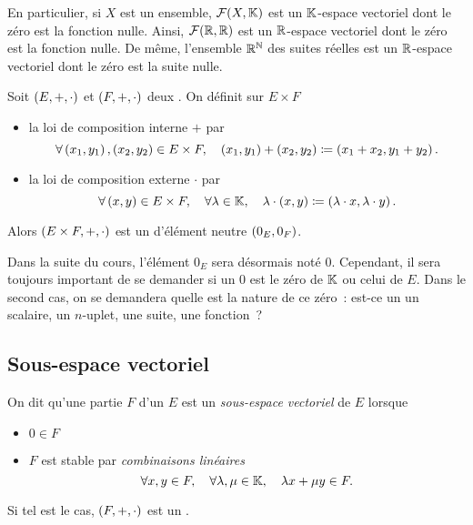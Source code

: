 \documentclass{magnolia}
\begin{document}
\begin{remarqueUnique}
\remarque En particulier, si $X$ est un ensemble, $\mathcal{F}(X,\mathbb{K})$ est un
  $\mathbb{K}$-espace vectoriel dont le \og zéro \fg est la fonction nulle. Ainsi,
  $\mathcal{F}(\mathbb{R},\mathbb{R})$ est un $\mathbb{R}$-espace vectoriel dont le \og zéro \fg est
  la fonction nulle. De même, l'ensemble $\mathbb{R}^{\mathbb{N}}$ des suites réelles est un
  $\mathbb{R}$-espace vectoriel dont le \og zéro \fg est la suite nulle.
\end{remarqueUnique}

\begin{definition}[utile=-2]
Soit $\left(E,+,\cdot\right)$ et $\left(F,+,\cdot\right)$ deux \Kevs. On définit sur $E\times F$
\begin{itemize}
\item la loi de composition interne $+$ par
  \[\forall \left(x_1,y_1\right),\left(x_2,y_2\right)\in E\times F ,\quad
    \left(x_1,y_1\right)+\left(x_2,y_2\right)\coloneqq\left(x_1+x_2,y_1+y_2\right).\]
\item la loi de composition externe $\cdot$ par
  \[\forall \left(x,y\right)\in E\times F ,\quad \forall \lambda\in\mathbb{K} ,\quad
    \lambda\cdot\left(x,y\right)\coloneqq\left(\lambda\cdot x,\lambda\cdot y\right).\]
\end{itemize}
Alors $\left(E\times F,+,\cdot\right)$ est un \Kev d'élément neutre $\left(0_E,0_F\right)$.
\end{definition}






Dans la suite du cours, l'élément $0_E$ sera désormais noté $0$. Cependant, il sera
toujours important de se demander si un $0$ est le zéro de $\mathbb{K}$ ou celui de $E$. Dans
le second cas, on se demandera quelle est la nature de ce zéro~:
est-ce un un scalaire, un $n$-uplet, une suite, une fonction~?

\subsection{Sous-espace vectoriel}

\begin{definition}[utile=-3]
On dit qu'une partie $F$ d'un \Kev $E$ est un \emph{sous-espace vectoriel} de $E$
lorsque
\begin{itemize}
\item $0\in F$
\item $F$ est stable par \emph{combinaisons linéaires}
  \[\forall x,y\in F ,\quad \forall \lambda,\mu\in\mathbb{K} ,\quad
    \lambda x+\mu y\in F.\]
\end{itemize}
Si tel est le cas, $\left(F,+,\cdot\right)$ est un \Kev.
\end{definition}
\end{document}
